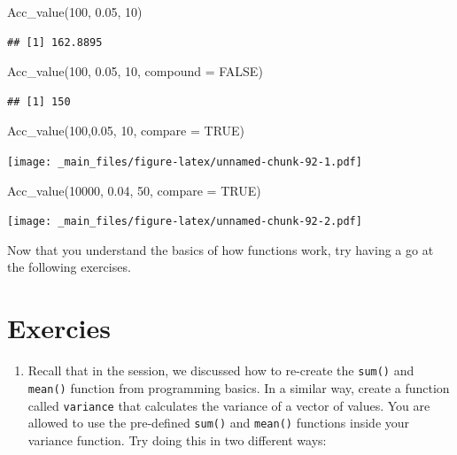 \documentclass[
]{book}
\newenvironment{Shaded}{\begin{snugshade}}{\end{snugshade}}
\newcommand{\AttributeTok}[1]{\textcolor[rgb]{0.77,0.63,0.00}{#1}}
\newcommand{\ConstantTok}[1]{\textcolor[rgb]{0.00,0.00,0.00}{#1}}
\newcommand{\DecValTok}[1]{\textcolor[rgb]{0.00,0.00,0.81}{#1}}
\newcommand{\FloatTok}[1]{\textcolor[rgb]{0.00,0.00,0.81}{#1}}
\newcommand{\FunctionTok}[1]{\textcolor[rgb]{0.00,0.00,0.00}{#1}}
\newcommand{\NormalTok}[1]{#1}
\providecommand{\tightlist}{%
  \setlength{\itemsep}{0pt}\setlength{\parskip}{0pt}}
\theoremstyle{definition}
\theoremstyle{definition}
\theoremstyle{definition}
\theoremstyle{definition}
\theoremstyle{remark}
\begin{document}
\begin{Shaded}
\begin{Highlighting}[]
\FunctionTok{Acc\_value}\NormalTok{(}\DecValTok{100}\NormalTok{, }\FloatTok{0.05}\NormalTok{, }\DecValTok{10}\NormalTok{)}
\end{Highlighting}
\end{Shaded}

\begin{verbatim}
## [1] 162.8895
\end{verbatim}

\begin{Shaded}
\begin{Highlighting}[]
\FunctionTok{Acc\_value}\NormalTok{(}\DecValTok{100}\NormalTok{, }\FloatTok{0.05}\NormalTok{, }\DecValTok{10}\NormalTok{, }\AttributeTok{compound =} \ConstantTok{FALSE}\NormalTok{)}
\end{Highlighting}
\end{Shaded}

\begin{verbatim}
## [1] 150
\end{verbatim}

\begin{Shaded}
\begin{Highlighting}[]
\FunctionTok{Acc\_value}\NormalTok{(}\DecValTok{100}\NormalTok{,}\FloatTok{0.05}\NormalTok{, }\DecValTok{10}\NormalTok{, }\AttributeTok{compare =} \ConstantTok{TRUE}\NormalTok{)}
\end{Highlighting}
\end{Shaded}

\texttt{[image: \_main\_files/figure-latex/unnamed-chunk-92-1.pdf]}

\begin{Shaded}
\begin{Highlighting}[]
\FunctionTok{Acc\_value}\NormalTok{(}\DecValTok{10000}\NormalTok{, }\FloatTok{0.04}\NormalTok{, }\DecValTok{50}\NormalTok{, }\AttributeTok{compare =} \ConstantTok{TRUE}\NormalTok{)}
\end{Highlighting}
\end{Shaded}

\texttt{[image: \_main\_files/figure-latex/unnamed-chunk-92-2.pdf]}

Now that you understand the basics of how functions work, try having a go at the following exercises.

\hypertarget{exercies}{%
\section{Exercies}\label{exercies}}

\begin{enumerate}
\def\labelenumi{\arabic{enumi}.}
\tightlist
\item
  Recall that in the session, we discussed how to re-create the \texttt{sum()} and \texttt{mean()} function from programming basics. In a similar way, create a function called \texttt{variance} that calculates the variance of a vector of values. You are allowed to use the pre-defined \texttt{sum()} and \texttt{mean()} functions inside your variance function. Try doing this in two different ways:
\end{enumerate}
\end{document}
